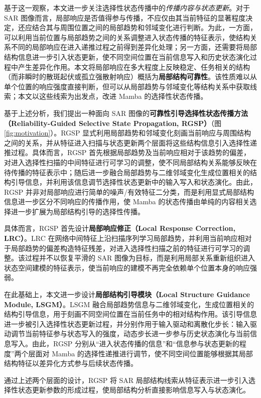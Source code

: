 \documentclass[journal]{IEEEtran}
\begin{document}
基于这一观察，本文进一步关注选择性状态传播中的\emph{传播内容与状态更新}。对于 SAR 图像而言，局部响应是否值得参与传播，不应仅由其当前特征的显著程度决定，还应结合其与周围位置之间的局部趋势和邻域变化进行判断。为此，一方面，可以利用当前位置与局部趋势之间的关系调整进入状态传播的特征表示，使结构关系不同的局部响应在进入递推过程之前得到差异化处理；另一方面，还需要将局部结构信息进一步引入状态更新，使不同空间位置在当前信息写入和历史状态演化过程中产生差异化作用。本文将局部响应在多大程度上反映稳定、任务相关的结构（而非瞬时的散斑起伏或孤立强散射响应）概括为\textbf{局部结构可靠性}。该性质难以从单个位置的响应强度直接判断，但可以从局部趋势与邻域变化等结构关系中获取线索；本文以这些线索为出发点，改进 Mamba 的选择性状态传播。

基于上述分析，我们提出一种面向 SAR 图像的\textbf{可靠性引导选择性状态传播方法（Reliability-Guided Selective State Propagation, RGSP）}（图\ref{fig:motivation}）。RGSP 显式利用局部趋势和邻域变化刻画当前响应与周围结构之间的关系，并从特征进入扫描与状态更新两个层面将这些结构信息引入选择性递推过程。具体而言，RGSP 首先根据局部趋势及当前响应相对于该趋势的偏差，对进入选择性扫描的中间特征进行可学习的调整，使不同局部结构关系能够反映在待传播的特征表示中；随后进一步融合局部趋势与二维邻域变化生成位置相关的结构引导信息，并利用该信息调节选择性状态更新中的输入写入和状态演化。由此，RGSP 并非对局部响应进行简单的噪声/有效特征二分类，而是利用显式局部结构信息进一步区分不同响应的传播作用，使 Mamba 的状态传播由单纯的内容相关选择进一步扩展为局部结构引导的选择性传播。

具体而言，RGSP 首先设计\textbf{局部响应修正（Local Response Correction, LRC）}。LRC 在网络中间特征上沿扫描序列学习局部趋势，并利用当前响应相对于局部趋势的偏差构造特征残差，对进入选择性扫描之前的特征进行可学习的调整。该过程并不以恢复平滑的 SAR 图像为目标，而是利用局部关系重新组织进入状态空间建模的特征表示，使当前响应的建模不再完全依赖单个位置本身的响应强弱。

在此基础上，本文进一步设计\textbf{局部结构引导模块（Local Structure Guidance Module, LSGM）}。LSGM 融合局部趋势信息与二维邻域变化，生成位置相关的结构引导信息，用于刻画不同空间位置在当前任务中的相对结构作用。该引导信息进一步被引入选择性状态更新过程，并分别作用于输入驱动和离散化步长：输入驱动调节当前特征参与状态写入的强度，动态步长进一步参与历史状态演化与当前信息写入。由此，RGSP 分别从“进入状态传播的信息”和“信息参与状态更新的程度”两个层面对 Mamba 的选择性递推进行调节，使不同空间位置能够根据其局部结构特征以差异化方式参与后续状态传播。

通过上述两个层面的设计，RGSP 将 SAR 局部结构线索从特征表示进一步引入选择性状态更新参数的形成过程，使局部结构分析直接影响信息写入与状态演化。
\end{document}

